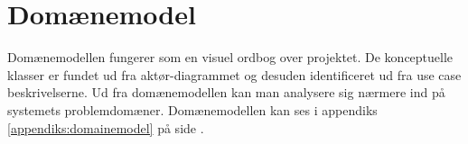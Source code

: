 \section{Domænemodel}
\label{sec:Domainmodel}

Domænemodellen fungerer som en visuel ordbog over projektet. De konceptuelle klasser er fundet ud fra aktør-diagrammet og desuden identificeret ud fra use case beskrivelserne. Ud fra domænemodellen kan man analysere sig nærmere ind på systemets problemdomæner. Domænemodellen kan ses i appendiks \ref{appendiks:domainemodel} på side \pageref{appendiks:domainemodel}.